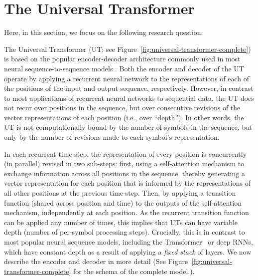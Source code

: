 \section{The Universal Transformer }%
Here, in this section, we focus on the following research question:

The Universal Transformer (UT; see Figure~\ref{fig:universal-transformer-complete}) is based on the popular encoder-decoder architecture commonly used in most neural sequence-to-sequence models \citep{sutskever14,cho2014learning,transformer}. Both the encoder and decoder of the UT operate by applying a recurrent neural network to the representations of each of the positions of the input and output sequence, respectively. However, in contrast to most applications of recurrent neural networks to sequential data, the UT does not recur over positions in the sequence, but over consecutive revisions of the vector representations of each position (i.e., over ``depth''). In other words, the UT is not computationally bound by the number of symbols in the sequence, but only by the number of revisions made to each symbol's representation.

In each recurrent time-step, the representation of every position is concurrently (in parallel) revised in two sub-steps: first, using a self-attention mechanism to exchange information across all positions in the sequence, thereby generating a vector representation for each position that is informed by the representations of all other positions at the previous time-step. Then, by applying a transition function (shared across position and time) to the outputs of the self-attention mechanism, independently at each position. As the recurrent transition function can be applied any number of times, this implies that UTs can have variable depth (number of per-symbol processing steps). Crucially, this is in contrast to most popular neural sequence models, including the Transformer~\citep{transformer} or deep RNNs, which have constant depth as a result of applying a \emph{fixed stack} of layers.  We now describe the encoder and decoder in more detail (See Figure~\ref{fig:universal-transformer-complete} for the schema of the complete model.).

